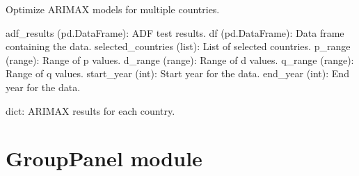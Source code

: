 \documentclass[letterpaper,10pt,english]{sphinxmanual}
\begin{document}

\begin{fulllineitems}
\label{\detokenize{Arimax:Arimax.optimize_arimax_models}}
\pysigstartsignatures
{}
\pysigstopsignatures
\sphinxAtStartPar
Optimize ARIMAX models for multiple countries.
\begin{description}
\sphinxAtStartPar
adf\_results (pd.DataFrame): ADF test results.
df (pd.DataFrame): Data frame containing the data.
selected\_countries (list): List of selected countries.
p\_range (range): Range of p values.
d\_range (range): Range of d values.
q\_range (range): Range of q values.
start\_year (int): Start year for the data.
end\_year (int): End year for the data.

\sphinxAtStartPar
dict: ARIMAX results for each country.

\end{description}

\end{fulllineitems}


\sphinxstepscope


\section{GroupPanel module}
\label{\detokenize{GroupPanel:module-GroupPanel}}\label{\detokenize{GroupPanel:grouppanel-module}}\label{\detokenize{GroupPanel::doc}}
\end{document}
